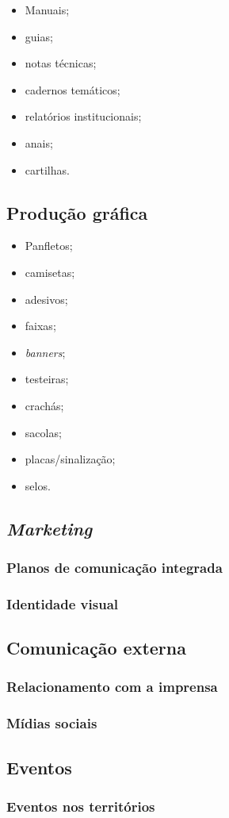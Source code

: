 \begin{itemize}
	\item
	Manuais;
	\item
	guias;
	\item
	notas técnicas;
	\item
	cadernos temáticos;
	\item
	relatórios institucionais;
	\item
	anais;
	\item
	cartilhas.
\end{itemize}

\subsection{Produção gráfica}

\begin{itemize}
	\item
	Panfletos;
	\item
	camisetas;
	\item
	adesivos;
	\item
	faixas;
	\item
	\emph{banners};
	\item
	testeiras;
	\item
	crachás;
	\item
	sacolas;
	\item
	placas/sinalização;
	\item
	selos.
\end{itemize}

\subsection{\emph{Marketing}}

\subsubsection{Planos de comunicação integrada}

\subsubsection{Identidade visual}

\subsection{Comunicação externa}

\subsubsection{Relacionamento com a imprensa}

\subsubsection{Mídias sociais}

\subsection{Eventos}

\subsubsection{Eventos nos territórios}
